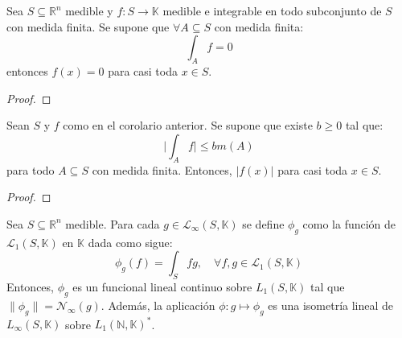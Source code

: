 \documentclass[12pt]{report}
\theoremstyle{largebreak}
\newcommand\cf[3]{\ensuremath{#1:#2\rightarrow#3}}
\newcommand\abs[1]{\ensuremath{\big|#1\big|}}
\newcommand\norm[1]{\ensuremath{\|#1\|}}
\newcommand{\N}[2]{\ensuremath{\mathcal{N}_{#1}\left(#2\right)}}
\begin{document}
    \begin{cor}
        Sea $S\subseteq\mathbb{R}^n$ medible y $\cf{f}{S}{\mathbb{K}}$ medible e integrable en todo subconjunto de $S$ con medida finita. Se supone que $\forall A\subseteq S$ con medida finita:
        \begin{equation*}
            \int_A f=0
        \end{equation*}
        entonces $f(x)=0$ para casi toda $x\in S$.
    \end{cor}

    \begin{proof}
        
    \end{proof}

    \begin{cor}
        Sean $S$ y $f$ como en el corolario anterior. Se supone que existe $b\geq 0$ tal que:
        \begin{equation*}
            \abs{\int_A f}\leq b m(A)
        \end{equation*}
        para todo $A\subseteq S$ con medida finita. Entonces, $\abs{f(x)}$ para casi toda $x\in S$.
    \end{cor}

    \begin{proof}
        
    \end{proof}

    \begin{theor}
        Sea $S\subseteq\mathbb{R}^n$ medible. Para cada $g\in\mathcal{L}_\infty(S,\mathbb{K})$ se define $\phi_g$ como la función de $\mathcal{L}_1(S,\mathbb{K})$ en $\mathbb{K}$ dada como sigue:
        \begin{equation*}
            \phi_g(f)=\int_S fg,\quad\forall f,g\in\mathcal{L}_1(S,\mathbb{K})
        \end{equation*}
        Entonces, $\phi_g$ es un funcional lineal continuo sobre $L_1(S,\mathbb{K})$ tal que $\norm{\phi_g}=\N{\infty}{g}$. Además, la aplicación $\phi:g\mapsto \phi_g$ es una isometría lineal de $L_\infty(S,\mathbb{K})$ sobre $L_1(\mathbb{N},\mathbb{K})^*$.
    \end{theor}
\end{document}
